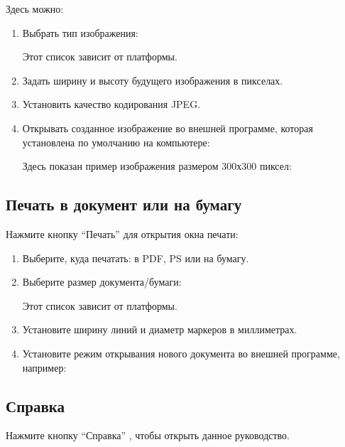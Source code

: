 \documentclass[12pt]{article}
\begin{document}
Здесь можно:
\begin{enumerate}
\item Выбрать тип изображения:


Этот список зависит от платформы.
\item Задать ширину и высоту будущего изображения в пикселах.
\item Установить качество кодирования JPEG.
\item Открывать созданное изображение во внешней программе, 
которая установлена по умолчанию на компьютере:


Здесь показан пример изображения размером 300х300 пиксел:


\end{enumerate}


\subsection{Печать в документ или на бумагу}

Нажмите кнопку ``Печать''  для открытия окна печати:


\begin{enumerate}
\item Выберите, куда печатать: в PDF, PS или на бумагу.
\item Выберите размер документа/бумаги:


Этот список зависит от платформы.

\item Установите ширину линий и диаметр маркеров в миллиметрах.

\item Установите режим открывания нового документа во внешней программе, например:


\end{enumerate}


\subsection{Справка}

Нажмите кнопку ``Справка'' , чтобы открыть данное руководство.
\end{document}
